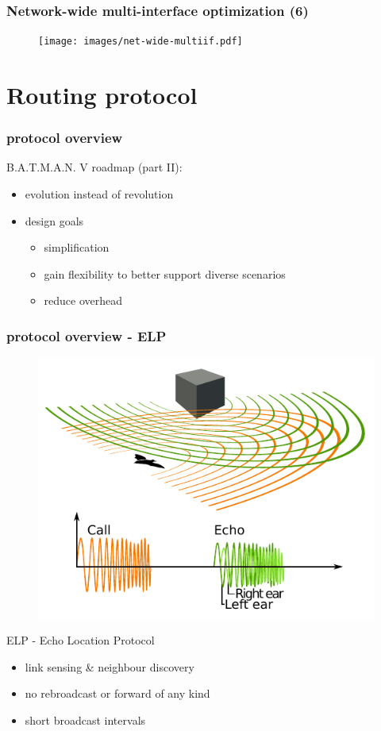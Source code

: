 \documentclass[slidestop]{beamer}
\begin{document}
\begin{frame}[c]
	\frametitle{Network-wide multi-interface optimization (6)}

	\begin{figure}
		\centering
		\texttt{[image: images/net-wide-multiif.pdf]}
	\end{figure}
\end{frame}

\section{Routing protocol}
\begin{frame}[c]
	\frametitle{protocol overview}

	B.A.T.M.A.N. V roadmap (part II):
	\begin{itemize}
		\item evolution instead of revolution
		\item design goals
			\begin{itemize}
				\item simplification
				\item gain flexibility to better support diverse scenarios
				\item reduce overhead
			\end{itemize}
	\end{itemize}
\end{frame}

\begin{frame}[c]
	\frametitle{protocol overview - ELP}
	\begin{figure}
		\centering
		\includegraphics[scale=0.5]{ext_images/Animal_echolocation.pdf}
	\end{figure}

	ELP - Echo Location Protocol
	\begin{itemize}
		\item link sensing \& neighbour discovery
		\item no rebroadcast or forward of any kind
		\item short broadcast intervals
	\end{itemize}
\end{frame}
\end{document}
